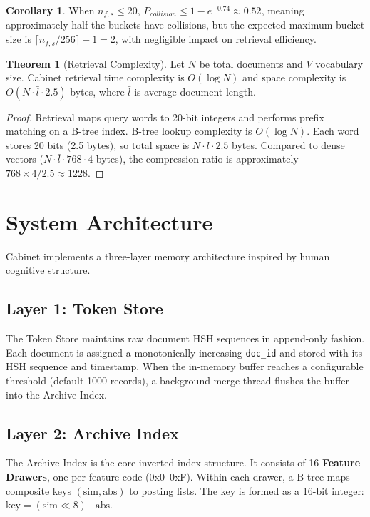 \documentclass[11pt,a4paper]{article}
\theoremstyle{definition}
\newtheorem{theorem}{Theorem}[section]
\newtheorem{corollary}{Corollary}[section]
\begin{document}
\begin{corollary}
When $n_{f,s} \leq 20$, $P_{collision} \leq 1 - e^{-0.74} \approx 0.52$, meaning approximately half the buckets have collisions, but the expected maximum bucket size is $\lceil n_{f,s}/256 \rceil + 1 = 2$, with negligible impact on retrieval efficiency.
\end{corollary}

\begin{theorem}[Retrieval Complexity]
Let $N$ be total documents and $V$ vocabulary size. Cabinet retrieval time complexity is $O(\log N)$ and space complexity is $O(N \cdot \bar{l} \cdot 2.5)$ bytes, where $\bar{l}$ is average document length.
\end{theorem}

\begin{proof}
Retrieval maps query words to 20-bit integers and performs prefix matching on a B-tree index. B-tree lookup complexity is $O(\log N)$. Each word stores 20 bits (2.5 bytes), so total space is $N \cdot \bar{l} \cdot 2.5$ bytes. Compared to dense vectors ($N \cdot \bar{l} \cdot 768 \cdot 4$ bytes), the compression ratio is approximately $768 \times 4 / 2.5 \approx 1228$.
\end{proof}

\section{System Architecture}
\label{sec:architecture}

Cabinet implements a three-layer memory architecture inspired by human cognitive structure.

\subsection{Layer 1: Token Store}

The Token Store maintains raw document HSH sequences in append-only fashion. Each document is assigned a monotonically increasing \texttt{doc\_id} and stored with its HSH sequence and timestamp. When the in-memory buffer reaches a configurable threshold (default 1000 records), a background merge thread flushes the buffer into the Archive Index.

\subsection{Layer 2: Archive Index}

The Archive Index is the core inverted index structure. It consists of 16 \textbf{Feature Drawers}, one per feature code (0x0--0xF). Within each drawer, a B-tree maps composite keys $(\text{sim}, \text{abs})$ to posting lists. The key is formed as a 16-bit integer: $\text{key} = (\text{sim} \ll 8) \;|\; \text{abs}$.
\end{document}
